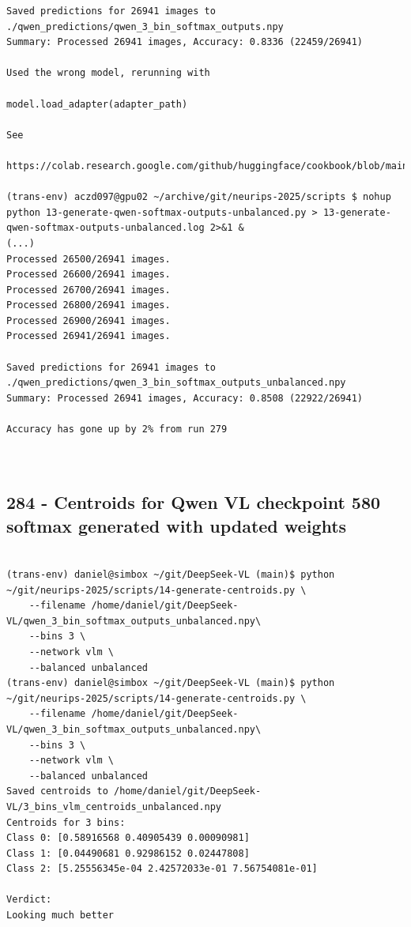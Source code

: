 \begin{verbatim}
Saved predictions for 26941 images to ./qwen_predictions/qwen_3_bin_softmax_outputs.npy
Summary: Processed 26941 images, Accuracy: 0.8336 (22459/26941)

Used the wrong model, rerunning with

model.load_adapter(adapter_path)

See

https://colab.research.google.com/github/huggingface/cookbook/blob/main/notebooks/en/fine_tuning_vlm_trl.ipynb#scrollTo=mQi2xBXk4sHe

(trans-env) aczd097@gpu02 ~/archive/git/neurips-2025/scripts $ nohup python 13-generate-qwen-softmax-outputs-unbalanced.py > 13-generate-qwen-softmax-outputs-unbalanced.log 2>&1 &
(...)
Processed 26500/26941 images.
Processed 26600/26941 images.
Processed 26700/26941 images.
Processed 26800/26941 images.
Processed 26900/26941 images.
Processed 26941/26941 images.

Saved predictions for 26941 images to ./qwen_predictions/qwen_3_bin_softmax_outputs_unbalanced.npy
Summary: Processed 26941 images, Accuracy: 0.8508 (22922/26941)

Accuracy has gone up by 2% from run 279

    
\end{verbatim}

\subsection{284 - Centroids for Qwen VL checkpoint 580 softmax generated with updated weights}
\label{app_res:284}

\begin{verbatim}

(trans-env) daniel@simbox ~/git/DeepSeek-VL (main)$ python ~/git/neurips-2025/scripts/14-generate-centroids.py \
    --filename /home/daniel/git/DeepSeek-VL/qwen_3_bin_softmax_outputs_unbalanced.npy\
    --bins 3 \
    --network vlm \
    --balanced unbalanced
(trans-env) daniel@simbox ~/git/DeepSeek-VL (main)$ python ~/git/neurips-2025/scripts/14-generate-centroids.py \
    --filename /home/daniel/git/DeepSeek-VL/qwen_3_bin_softmax_outputs_unbalanced.npy\
    --bins 3 \
    --network vlm \
    --balanced unbalanced
Saved centroids to /home/daniel/git/DeepSeek-VL/3_bins_vlm_centroids_unbalanced.npy
Centroids for 3 bins:
Class 0: [0.58916568 0.40905439 0.00090981]
Class 1: [0.04490681 0.92986152 0.02447808]
Class 2: [5.25556345e-04 2.42572033e-01 7.56754081e-01]

Verdict:
Looking much better
    
\end{verbatim}

